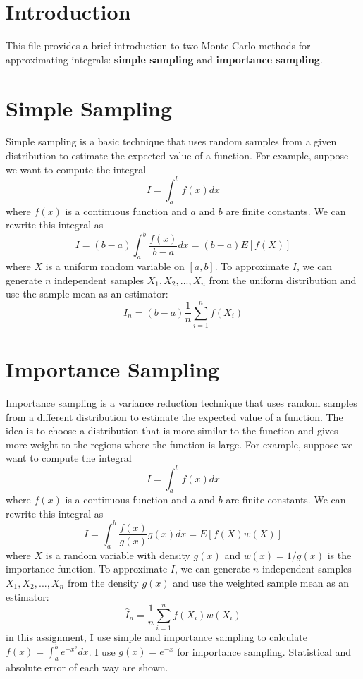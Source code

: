 \documentclass{article}
\begin{document}
\section{Introduction}
This file provides a brief introduction to two Monte Carlo methods for approximating integrals: \textbf{simple sampling} and \textbf{importance sampling}.

\section{Simple Sampling}
Simple sampling is a basic technique that uses random samples from a given distribution to estimate the expected value of a function. For example, suppose we want to compute the integral
\begin{equation}
I = \int_a^b f(x) dx
\end{equation}
where $f(x)$ is a continuous function and $a$ and $b$ are finite constants. We can rewrite this integral as
\begin{equation}
I = (b-a) \int_a^b \frac{f(x)}{b-a} dx = (b-a) E[f(X)]
\end{equation}
where $X$ is a uniform random variable on $[a,b]$. To approximate $I$, we can generate $n$ independent samples $X_1, X_2, ..., X_n$ from the uniform distribution and use the sample mean as an estimator:
\begin{equation}
\hat{I}_n = (b-a) \frac{1}{n} \sum_{i=1}^n f(X_i)
\end{equation}

\section{Importance Sampling}
Importance sampling is a variance reduction technique that uses random samples from a different distribution to estimate the expected value of a function. The idea is to choose a distribution that is more similar to the function and gives more weight to the regions where the function is large. For example, suppose we want to compute the integral
\begin{equation}
I = \int_a^b f(x) dx
\end{equation}
where $f(x)$ is a continuous function and $a$ and $b$ are finite constants. We can rewrite this integral as
\begin{equation}
I = \int_a^b \frac{f(x)}{g(x)} g(x) dx = E[f(X) w(X)]
\end{equation}
where $X$ is a random variable with density $g(x)$ and $w(x) = 1/g(x)$ is the importance function. To approximate $I$, we can generate $n$ independent samples $X_1, X_2, ..., X_n$ from the density $g(x)$ and use the weighted sample mean as an estimator:
\begin{equation}
\hat{I}_n = \frac{1}{n} \sum_{i=1}^n f(X_i) w(X_i)
\end{equation}
in this assignment, I use simple and importance sampling to calculate $f(x) = \int_a^b e^{-x^2} dx$. I use $g(x)=e^{-x}$ for importance sampling. Statistical and absolute error of each way are shown.
\end{document}
